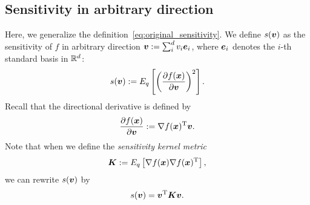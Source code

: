 \subsection{Sensitivity in arbitrary direction}
%
Here, we generalize the definition~\eqref{eq:original_sensitivity}.
We define $s(\mbox{\boldmath $v$})$ as the sensitivity of $f$ in arbitrary direction $\mbox{\boldmath $v$} := \sum_{i}^{d} v_i
\mbox{\boldmath $e$}_i$, where $\mbox{\boldmath $e$}_i$ denotes the $i$-th standard basis in $\mathbb{R}^d$:
%
\begin{align}
\begin{split}
 s(\mbox{\boldmath $v$}) := E_q\left[ \left( \frac{\partial f(\mbox{\boldmath $x$})}{\partial \mbox{\boldmath $v$}} \right)^2 \right].
\end{split} \label{eq:koyamada_sensitivity}
\end{align}
%
Recall that the directional derivative is defined by
\begin{align}
\begin{split}
\frac{\partial f(\mbox{\boldmath $x$})}{\partial \mbox{\boldmath $v$}} := \nabla f(\mbox{\boldmath $x$})^{\mathrm{T}} \mbox{\boldmath $v$}.
\end{split}
\end{align}
%
Note that when we define the \textit{sensitivity kernel metric}
%
\begin{align}
\begin{split}
 \mbox{\boldmath $K$}:= E_q \left[
 \nabla f(\mbox{\boldmath $x$}) \nabla f(\mbox{\boldmath $x$})^{\mathrm{T}}
 \right],
\end{split}  \label{eq:koyamada_inner_p}
\end{align}
%
we can rewrite $s(\mbox{\boldmath $v$})$ by
%
\begin{align}
\begin{split}
 s(\mbox{\boldmath $v$}) = \mbox{\boldmath $v$}^{\mathrm{T}} \mbox{\boldmath $K$} \mbox{\boldmath $v$}.
\end{split} \label{eq:koyamada_metric}
\end{align}

